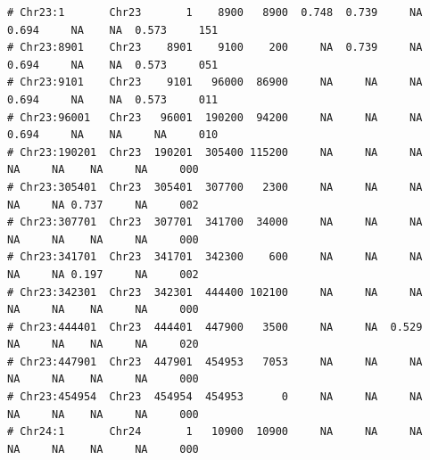 \documentclass{article}\usepackage[]{graphicx}\usepackage[]{color}
\makeatletter
\newenvironment{kframe}{%
 \def\at@end@of@kframe{}%
 \ifinner\ifhmode%
  \def\at@end@of@kframe{\end{minipage}}%
  \begin{minipage}{\columnwidth}%
 \fi\fi%
 \def\FrameCommand##1{\hskip\@totalleftmargin \hskip-\fboxsep
 \colorbox{shadecolor}{##1}\hskip-\fboxsep
     \hskip-\linewidth \hskip-\@totalleftmargin \hskip\columnwidth}%
 \MakeFramed {\advance\hsize-\width
   \@totalleftmargin\z@ \linewidth\hsize
   \@setminipage}}%
 {\par\unskip\endMakeFramed%
 \at@end@of@kframe}
\newenvironment{knitrout}{}{} %
\makeatother
\begin{document}
\begin{knitrout}
\begin{kframe}
\begin{verbatim}
# Chr23:1       Chr23       1    8900   8900  0.748  0.739     NA  0.694     NA    NA  0.573     151
# Chr23:8901    Chr23    8901    9100    200     NA  0.739     NA  0.694     NA    NA  0.573     051
# Chr23:9101    Chr23    9101   96000  86900     NA     NA     NA  0.694     NA    NA  0.573     011
# Chr23:96001   Chr23   96001  190200  94200     NA     NA     NA  0.694     NA    NA     NA     010
# Chr23:190201  Chr23  190201  305400 115200     NA     NA     NA     NA     NA    NA     NA     000
# Chr23:305401  Chr23  305401  307700   2300     NA     NA     NA     NA     NA 0.737     NA     002
# Chr23:307701  Chr23  307701  341700  34000     NA     NA     NA     NA     NA    NA     NA     000
# Chr23:341701  Chr23  341701  342300    600     NA     NA     NA     NA     NA 0.197     NA     002
# Chr23:342301  Chr23  342301  444400 102100     NA     NA     NA     NA     NA    NA     NA     000
# Chr23:444401  Chr23  444401  447900   3500     NA     NA  0.529     NA     NA    NA     NA     020
# Chr23:447901  Chr23  447901  454953   7053     NA     NA     NA     NA     NA    NA     NA     000
# Chr23:454954  Chr23  454954  454953      0     NA     NA     NA     NA     NA    NA     NA     000
# Chr24:1       Chr24       1   10900  10900     NA     NA     NA     NA     NA    NA     NA     000
\end{verbatim}
\end{kframe}


\end{knitrout}
\end{document}
